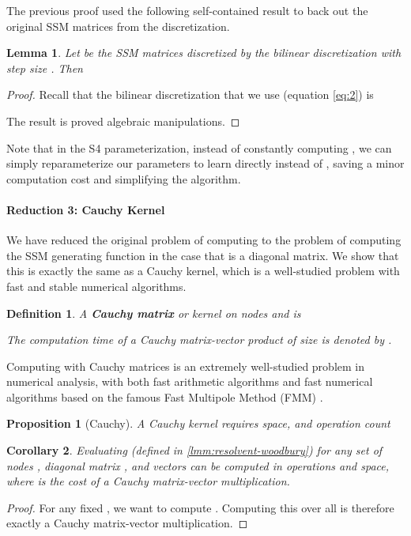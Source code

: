\documentclass{article}
\newtheorem{lemma}{Lemma}[section]
\newtheorem{corollary}[lemma]{Corollary}
\newtheorem{proposition}[theorem]{Proposition}
\newtheorem{definition}{Definition}
\newcommand{\methodabbrv}{S4}
\begin{document}
The previous proof used the following self-contained result to back out the original SSM matrices from the discretization.
\begin{lemma}\label{lmm:bilinear-resolvent}
  Let  be the SSM matrices  discretized by the bilinear discretization with step size . Then
  
\end{lemma}
\begin{proof}Recall that the bilinear discretization that we use (equation \eqref{eq:2}) is
  
  The result is proved algebraic manipulations.
  
\end{proof}

Note that in the \methodabbrv{} parameterization, instead of constantly computing ,
we can simply reparameterize our parameters to learn  directly instead of ,
saving a minor computation cost and simplifying the algorithm.

\paragraph{Reduction 3: Cauchy Kernel}
We have reduced the original problem of computing  to the problem of computing the SSM generating function 
in the case that  is a diagonal matrix.
We show that this is exactly the same as a Cauchy kernel, which is a well-studied problem with fast and stable numerical algorithms.

\begin{definition}\label{def:cauchy}
  A \textbf{Cauchy matrix} or kernel on nodes  and  is
  
  The computation time of a Cauchy matrix-vector product of size  is denoted by .
\end{definition}

Computing with Cauchy matrices is an extremely well-studied problem in numerical analysis,
with both fast arithmetic algorithms and fast numerical algorithms based on the famous Fast Multipole Method (FMM)
\citep{pan2001structured,pan2015transformations,pan2017fast}.
\begin{proposition}[Cauchy]\label{prop:cauchy}
  A Cauchy kernel requires  space, and operation count
   \varepsilon 
\end{proposition}

\begin{corollary}Evaluating  (defined in \cref{lmm:resolvent-woodbury}) for any set of nodes , diagonal matrix , and vectors  can be computed in  operations and  space, where  is the cost of a Cauchy matrix-vector multiplication.
\end{corollary}
\begin{proof}For any fixed , we want to compute . Computing this over all  is therefore exactly a Cauchy matrix-vector multiplication.
\end{proof}
\end{document}
